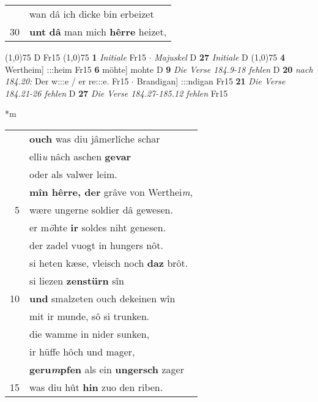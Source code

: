 \documentclass[8pt,a4paper,notitlepage]{article}
\begin{document}
\begin{table}[ht]
\begin{minipage}[t]{0.5\linewidth}
\begin{tabular}{rl}
 & wan dâ ich dicke bin erbeizet\\ 
30 & \textbf{unt} \textbf{dâ} man mich \textbf{hêrre} heizet,\\ 
\end{tabular}
\scriptsize
\line(1,0){75} \newline
D Fr15 \newline
\line(1,0){75} \newline
\textbf{1} \textit{Initiale} Fr15   $\cdot$ \textit{Majuskel} D  \textbf{27} \textit{Initiale} D  \newline
\line(1,0){75} \newline
\textbf{4} Wertheim] :::heim Fr15 \textbf{6} möhte] mohte D \textbf{9} \textit{Die Verse 184.9-18 fehlen} D  \textbf{20} \textit{nach 184.20:} Der w:::e / er re:::e. Fr15   $\cdot$ Brandigan] :::ndigan Fr15 \textbf{21} \textit{Die Verse 184.21-26 fehlen} D  \textbf{27} \textit{Die Verse 184.27-185.12 fehlen} Fr15  \newline
\end{minipage}
\hspace{0.5cm}
\begin{minipage}[t]{0.5\linewidth}
\small
\begin{center}*m
\end{center}
\begin{tabular}{rl}
 & \textbf{ouch} was diu jâmerlîche schar\\ 
 & elli\textit{u} nâch aschen \textbf{gevar}\\ 
 & oder als valwer leim.\\ 
 & \textbf{mîn hêrre, der} grâve von Werthei\textit{m},\\ 
5 & wære ungerne soldier dâ gewesen.\\ 
 & er m\textit{ö}hte \textbf{ir} soldes niht genesen.\\ 
 & der zadel vuogt in hungers nôt.\\ 
 & si heten kæse, vleisch noch \textbf{daz} brôt.\\ 
 & si liezen \textbf{zenstürn} sîn\\ 
10 & \textbf{und} smalzeten ouch dekeinen wîn\\ 
 & mit ir munde, sô si trunken.\\ 
 & die wamme in nider sunken,\\ 
 & ir hüffe hôch und mager,\\ 
 & \textbf{geru\textit{m}pfen} als ein \textbf{ungersch} zager\\ 
15 & was diu hût \textbf{hin} zuo den riben.\\ 

\end{tabular}
\end{minipage}
\end{table}
\end{document}
